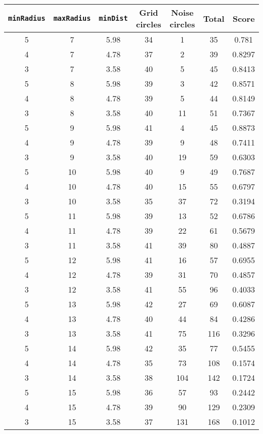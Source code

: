 \documentclass[letterpaper, 12pt]{article}
\begin{document}
\begin{longtable}{|c|c|c|c|c|c|c|}
\hline
\textbf{\texttt{minRadius}} & \textbf{\texttt{maxRadius}} & \textbf{\texttt{minDist}} & \textbf{Grid circles} & \textbf{Noise circles} & \textbf{Total} & \textbf{Score} \\
\hline
5 & 7 & 5.98 & 34 & 1 & 35 & 0.781 \\
\hline
4 & 7 & 4.78 & 37 & 2 & 39 & 0.8297 \\
\hline
3 & 7 & 3.58 & 40 & 5 & 45 & 0.8413 \\
\hline
5 & 8 & 5.98 & 39 & 3 & 42 & 0.8571 \\
\hline
4 & 8 & 4.78 & 39 & 5 & 44 & 0.8149 \\
\hline
3 & 8 & 3.58 & 40 & 11 & 51 & 0.7367 \\
\hline
5 & 9 & 5.98 & 41 & 4 & 45 & 0.8873 \\
\hline
4 & 9 & 4.78 & 39 & 9 & 48 & 0.7411 \\
\hline
3 & 9 & 3.58 & 40 & 19 & 59 & 0.6303 \\
\hline
5 & 10 & 5.98 & 40 & 9 & 49 & 0.7687 \\
\hline
4 & 10 & 4.78 & 40 & 15 & 55 & 0.6797 \\
\hline
3 & 10 & 3.58 & 35 & 37 & 72 & 0.3194 \\
\hline
5 & 11 & 5.98 & 39 & 13 & 52 & 0.6786 \\
\hline
4 & 11 & 4.78 & 39 & 22 & 61 & 0.5679 \\
\hline
3 & 11 & 3.58 & 41 & 39 & 80 & 0.4887 \\
\hline
5 & 12 & 5.98 & 41 & 16 & 57 & 0.6955 \\
\hline
4 & 12 & 4.78 & 39 & 31 & 70 & 0.4857 \\
\hline
3 & 12 & 3.58 & 41 & 55 & 96 & 0.4033 \\
\hline
5 & 13 & 5.98 & 42 & 27 & 69 & 0.6087 \\
\hline
4 & 13 & 4.78 & 40 & 44 & 84 & 0.4286 \\
\hline
3 & 13 & 3.58 & 41 & 75 & 116 & 0.3296 \\
\hline
5 & 14 & 5.98 & 42 & 35 & 77 & 0.5455 \\
\hline
4 & 14 & 4.78 & 35 & 73 & 108 & 0.1574 \\
\hline
3 & 14 & 3.58 & 38 & 104 & 142 & 0.1724 \\
\hline
5 & 15 & 5.98 & 36 & 57 & 93 & 0.2442 \\
\hline
4 & 15 & 4.78 & 39 & 90 & 129 & 0.2309 \\
\hline
3 & 15 & 3.58 & 37 & 131 & 168 & 0.1012 \\

\end{longtable}
\end{document}
